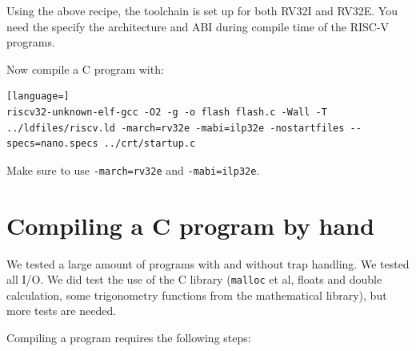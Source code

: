 \documentclass[12pt]{article}
\begin{document}
Using the above recipe, the toolchain is set up for both RV32I and RV32E. You need the specify the architecture and ABI during compile time of the RISC-V programs.

Now compile a C program with:

\begin{lstlisting}[language=]
riscv32-unknown-elf-gcc -O2 -g -o flash flash.c -Wall -T ../ldfiles/riscv.ld -march=rv32e -mabi=ilp32e -nostartfiles --specs=nano.specs ../crt/startup.c
\end{lstlisting}

Make sure to use \texttt{-march=rv32e} and \texttt{-mabi=ilp32e}.


\section{Compiling a C program by hand}
We tested a large amount of programs with and without trap handling. We tested all I/O. We did test the use of the C library (\texttt{malloc} et al, floats and double calculation, some trigonometry functions from the mathematical library), but more tests are needed.

Compiling a program requires the following steps:
\end{document}
